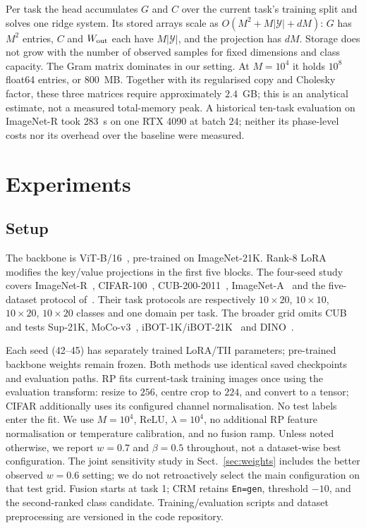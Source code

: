 \documentclass[runningheads]{llncs}
\begin{document}
Per task the head accumulates $G$ and $C$ over the current task's training split
and solves one ridge system. Its stored arrays scale as
$O(M^2+M|\mathcal Y|+dM)$: $G$ has $M^2$ entries, $C$ and $W_{\rm out}$
each have $M|\mathcal Y|$, and the projection has $dM$. Storage does not grow
with the number of observed samples for fixed dimensions and class capacity.
The Gram matrix dominates in our setting. At $M = 10^4$ it holds $10^8$ float64
entries, or $800$~MB. Together with its regularised copy and Cholesky factor,
these three matrices require approximately $2.4$~GB; this is an analytical
estimate, not a measured total-memory peak. A historical ten-task evaluation
on ImageNet-R took $283$~s on one RTX 4090 at batch $24$; neither its
phase-level costs nor its overhead over the baseline were measured.

\section{Experiments}
\label{sec:exp}

\subsection{Setup}
\label{sec:setup}

The backbone is ViT-B/16~\cite{ref_vit}, pre-trained on ImageNet-21K.
Rank-$8$ LoRA modifies the key/value projections in the first five blocks.
The four-seed study covers ImageNet-R~\cite{ref_imr}, CIFAR-100~\cite{ref_cifar},
CUB-200-2011~\cite{ref_cub}, ImageNet-A~\cite{ref_ima} and the five-dataset
protocol of~\cite{ref_hrmpet}. Their task protocols are respectively
$10\times20$, $10\times10$, $10\times20$, $10\times20$ classes and one domain
per task. The broader grid omits CUB and tests Sup-21K, MoCo-v3~\cite{ref_moco},
iBOT-1K/iBOT-21K~\cite{ref_ibot} and DINO~\cite{ref_dino}.

Each seed (42--45) has separately trained LoRA/TII parameters; pre-trained
backbone weights remain frozen. Both methods use identical saved checkpoints
and evaluation paths. RP fits current-task training images once using the
evaluation transform: resize to $256$, centre crop to $224$, and convert to a
tensor; CIFAR additionally uses its configured channel normalisation. No
test labels enter the fit. We use $M=10^4$, ReLU, $\lambda=10^4$, no additional
RP feature normalisation or temperature calibration, and no fusion ramp.
Unless noted otherwise, we report $w=0.7$ and $\beta=0.5$ throughout,
not a dataset-wise best configuration. The joint sensitivity study in
Sect.~\ref{sec:weights} includes the better observed $w=0.6$ setting; we do
not retroactively select the main configuration on that test grid.
Fusion starts at task 1; CRM retains \texttt{En=gen}, threshold $-10$, and the
second-ranked class candidate. Training/evaluation scripts and dataset
preprocessing are versioned in the code repository.
\end{document}
